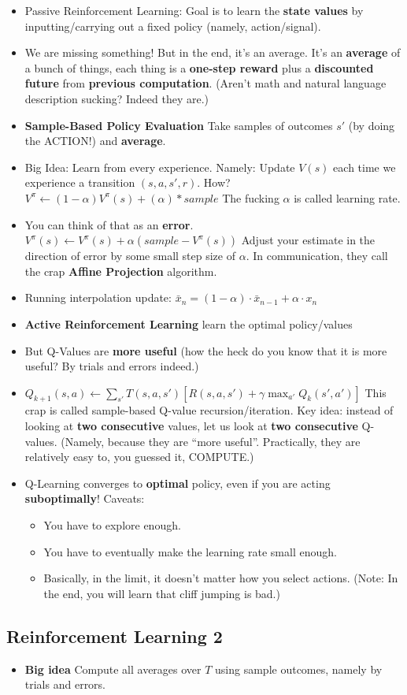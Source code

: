 \documentclass[twocolumn]{article}
\begin{document}
\begin{itemize}
\item Passive Reinforcement Learning: Goal is to learn the
  \textbf{state values} by inputting/carrying out a fixed policy
  (namely, action/signal).
\item We are missing something! But in the end, it's an average. It's
  an \textbf{average} of a bunch of things, each thing is a
  \textbf{one-step reward} plus a \textbf{discounted future} from
  \textbf{previous computation}. (Aren't math and natural language
  description sucking? Indeed they are.)
\item \textbf{Sample-Based Policy Evaluation} Take samples of outcomes
  $s'$ (by doing the ACTION!) and \textbf{average}.
\item Big Idea: Learn from every experience. Namely: Update $V(s)$
  each time we experience a transition $(s,a,s',r)$. How?
  $V^{\pi}\leftarrow (1-\alpha)V^{\pi}(s)+(\alpha)*sample$ The fucking
  $\alpha$ is called learning rate.
\item You can think of that as an
  \textbf{error}. $V^{\pi}(s)\leftarrow V^{\pi}(s)+\alpha (sample -
  V^{\pi}(s))$ Adjust your estimate in  the direction of error by some
  small step size of $\alpha$. In communication, they call the crap
  \textbf{Affine Projection} algorithm.
\item Running interpolation update: $\bar{x}_{n}=(1-\alpha)\cdot
  \bar{x}_{n-1}+\alpha\cdot x_{n}$
\item \textbf{Active Reinforcement Learning} {\color{red} learn the
    optimal policy/values}
\item But Q-Values are \textbf{more useful} (how the heck do you know
  that it is more useful? By trials and errors indeed.)
\item
  $Q_{k+1}(s,a)\leftarrow\sum_{s'}T(s,a,s')[R(s,a,s')+\gamma\displaystyle{\max_{a'}}Q_{k}(s',a')]$
  This crap is called sample-based Q-value recursion/iteration. Key
  idea: instead of looking at \textbf{two consecutive} {\color{red}
    values}, let us look at \textbf{two consecutive}
  Q-values. (Namely, because they are ``more useful''. Practically,
  they are relatively easy to, you guessed it, COMPUTE.)
\item Q-Learning converges to \textbf{optimal} policy, even if you are
  acting \textbf{suboptimally}! Caveats:
  \begin{itemize}
  \item You have to explore enough.
  \item You have to eventually make the learning rate small enough.
  \item Basically, in the limit, it doesn't matter how you select
    actions. (Note: In the end, you will learn that cliff jumping is
    bad.)
  \end{itemize}
\end{itemize}

\subsection{Reinforcement Learning 2}
\label{sec:reinf-learn-2}

\begin{itemize}
\item \textbf{Big idea} Compute all averages over $T$ using sample
  outcomes, namely by trials and errors. 
\end{itemize}
\end{document}
